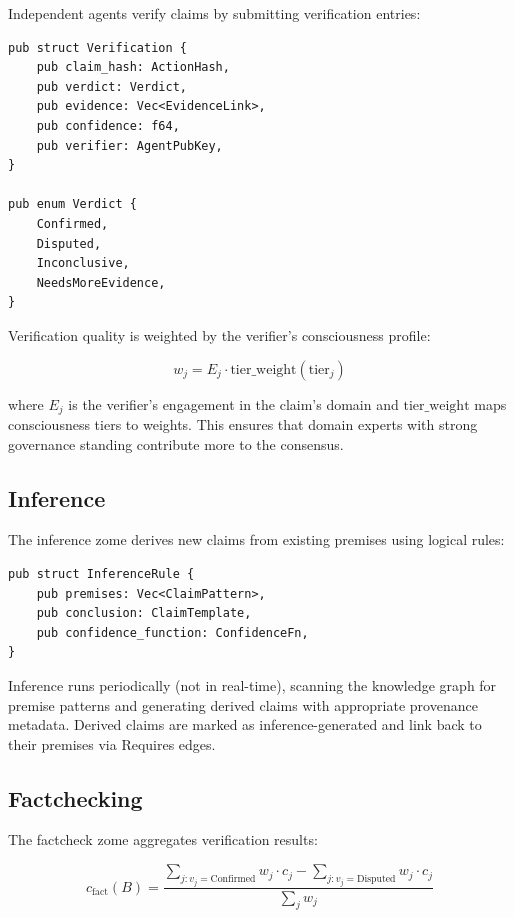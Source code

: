 \documentclass[11pt,twocolumn]{article}
\begin{document}
Independent agents verify claims by submitting verification entries:

\begin{lstlisting}
pub struct Verification {
    pub claim_hash: ActionHash,
    pub verdict: Verdict,
    pub evidence: Vec<EvidenceLink>,
    pub confidence: f64,
    pub verifier: AgentPubKey,
}

pub enum Verdict {
    Confirmed,
    Disputed,
    Inconclusive,
    NeedsMoreEvidence,
}
\end{lstlisting}

Verification quality is weighted by the verifier's consciousness profile:

\begin{equation}
  w_j = E_j \cdot \text{tier\_weight}(\text{tier}_j)
\end{equation}

where $E_j$ is the verifier's engagement in the claim's domain and
$\text{tier\_weight}$ maps consciousness tiers to weights. This ensures
that domain experts with strong governance standing contribute more to
the consensus.

\subsection{Inference}

The inference zome derives new claims from existing premises using
logical rules:

\begin{lstlisting}
pub struct InferenceRule {
    pub premises: Vec<ClaimPattern>,
    pub conclusion: ClaimTemplate,
    pub confidence_function: ConfidenceFn,
}
\end{lstlisting}

Inference runs periodically (not in real-time), scanning the knowledge
graph for premise patterns and generating derived claims with
appropriate provenance metadata. Derived claims are marked as
inference-generated and link back to their premises via Requires edges.

\subsection{Factchecking}

The factcheck zome aggregates verification results:

\begin{equation}
  c_{\text{fact}}(B) = \frac{\sum_{j: v_j = \text{Confirmed}} w_j \cdot c_j
    - \sum_{j: v_j = \text{Disputed}} w_j \cdot c_j}
    {\sum_{j} w_j}
\end{equation}
\end{document}
